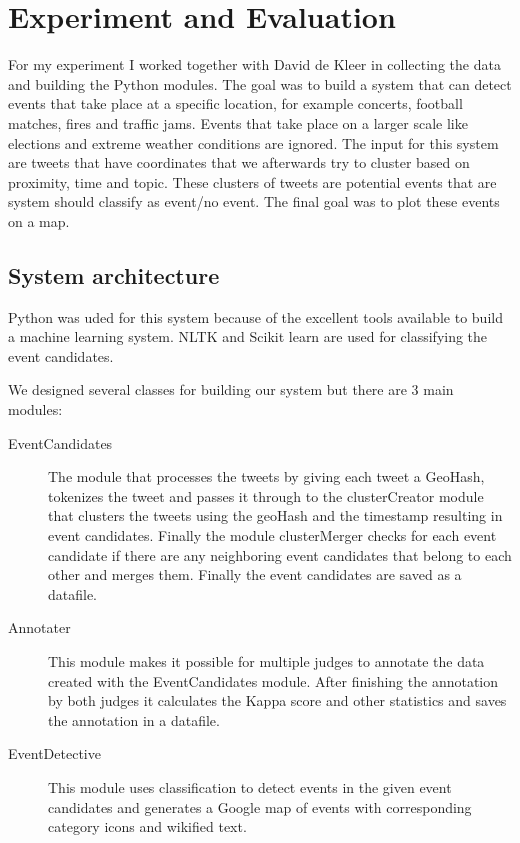\documentclass[
10pt, %
a4paper, %
oneside, %
headinclude,footinclude, %
BCOR5mm, %
]{scrartcl}
\begin{document}
\newpage
\section{Experiment and Evaluation}
For my experiment I worked together with David de Kleer in collecting the data and building the Python modules. The goal was to build a system that can detect events that take place at a specific location, for example concerts, football matches, fires and traffic jams.  Events that take place on a larger scale like elections and extreme weather conditions are ignored. The input for this system are tweets that have coordinates that we afterwards try to cluster based on proximity, time and topic. These clusters of tweets are potential events that are system should classify as event/no event. The final goal was to plot these events on a map.
\subsection{System architecture}
Python was uded for this system because of the excellent tools available to build a machine learning system. NLTK and Scikit learn are used for classifying the event candidates.

We designed several classes for building our system but there are 3 main modules:

\begin{description}

\item[EventCandidates] 
The module that processes the tweets by giving each tweet a GeoHash, tokenizes the tweet and passes it through to the clusterCreator module that clusters the tweets using the geoHash and the timestamp resulting in event candidates. Finally the module clusterMerger checks for each event candidate if there are any neighboring event candidates that belong to each other and merges them. Finally the event candidates are saved as a datafile.


\item[Annotater] 
This module makes it possible for multiple judges to annotate the data created with the EventCandidates module. After finishing the annotation by both judges it calculates the Kappa score and other statistics and saves the annotation in a datafile.


\item[EventDetective] 
This module uses classification to detect events in the given event candidates and generates a Google map of events with corresponding category icons and wikified text.


\end{description}
\end{document}
